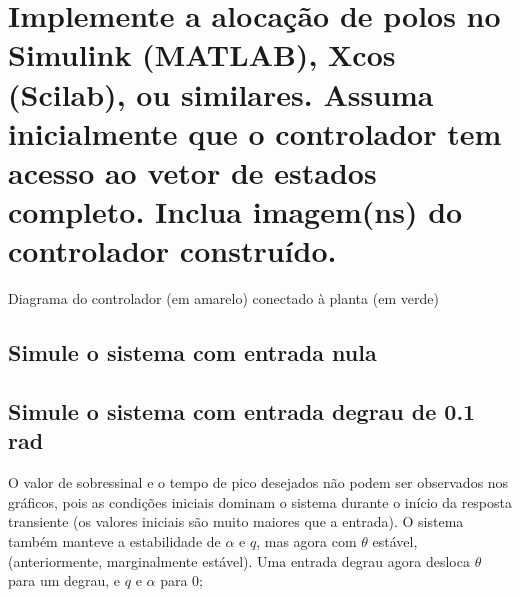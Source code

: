 \documentclass[13pt]{article}
\begin{document}
\hypertarget{implemente-a-alocauxe7uxe3o-de-polos-no-simulink-matlab-xcos-scilab-ou-similares.-assuma-inicialmente-que-o-controlador-tem-acesso-ao-vetor-de-estados-completo.-inclua-imagemns-do-controlador-construuxeddo.}{%
    \section{Implemente a alocação de polos no Simulink (MATLAB), Xcos
      (Scilab), ou similares. Assuma inicialmente que o controlador tem acesso
      ao vetor de estados completo. Inclua imagem(ns) do controlador
      construído.}}

Diagrama do controlador (em amarelo) conectado à planta (em verde)

\begin{figure}[H]
    \centering


    
\end{figure}

\hypertarget{simule-o-sistema-com-entrada-nula}{%
    \subsection{Simule o sistema com entrada
        nula}}

\begin{figure}[H]
    \centering


    
\end{figure}

\hypertarget{simule-o-sistema-com-entrada-degrau-de-0.1-rad}{%
    \subsection{Simule o sistema com entrada degrau de 0.1
        rad}}

\begin{figure}[H]
    \centering


    
\end{figure}

O valor de sobressinal e o tempo de pico desejados não podem ser
observados nos gráficos, pois as condições iniciais dominam o sistema
durante o início da resposta transiente (os valores iniciais são muito
maiores que a entrada). O sistema também manteve a estabilidade de
\(\alpha\) e \(q\), mas agora com \(\theta\) estável, (anteriormente,
marginalmente estável). Uma entrada degrau agora desloca \(\theta\) para um degrau, e
\(q\) e \(\alpha\) para 0;
\end{document}
